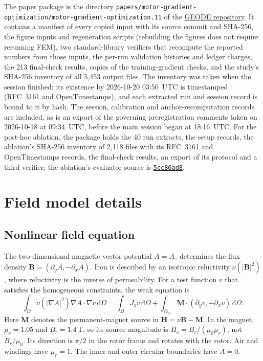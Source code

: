 \documentclass{anvil-paper}
\newcommand{\dd}{\,\mathrm{d}}
\begin{document}
The paper package is the directory
\texttt{papers/motor-gradient-optimization/motor-gradient-optimization.11}
of the \href{https://github.com/rjwalters/geode-fem}{GEODE repository}. It
contains a manifest of every copied input with its source commit and
SHA-256, the figure inputs and regeneration scripts (rebuilding the figures
does not require rerunning FEM), two standard-library verifiers that
recompute the reported numbers from those inputs, the per-run validation
histories and ledger charges, the 213 final-check results, copies of the
training-gradient checks, and the study's SHA-256 inventory of all 5,453
output files. The inventory was taken when the session finished; its
existence by 2026-10-20 03:50~UTC is timestamped (RFC~3161 and
OpenTimestamps), and each extracted run and session record is bound to it
by hash. The session, calibration and anchor-recomputation records are
included, as is an export of the governing preregistration comments taken
on 2026-10-18 at 09:34~UTC, before the main session began at 18:16~UTC.
For the post-hoc ablation, the package holds the 40 run extracts, the
setup records, the ablation's SHA-256 inventory of 2,118 files with its
RFC~3161 and OpenTimestamps records, the final-check results, an export of
its protocol and a third verifier; the ablation's evaluator source is
\href{https://github.com/rjwalters/geode-fem/tree/5cc86ad81aeea4847a2608fcafde22a1bbfb6990/benchmarks/motor_optimization}{\texttt{5cc86ad8}}.

\appendix
\section{Field model details}\label{sec:fieldmodel}
\subsection{Nonlinear field equation}
The two-dimensional magnetic vector potential $A=A_z$ determines the
flux density $\mathbf B=(\partial_y A,-\partial_x A)$. Iron is described
by an isotropic reluctivity $\nu(|\mathbf B|^2)$, where reluctivity is
the inverse of permeability. For a test function $v$ that satisfies the
homogeneous constraints, the weak equation is
\begin{equation}
 \int_\Omega \nu(|\nabla A|^2)\nabla A\cdot\nabla v\dd\Omega
 =\int_\Omega J_z v\dd\Omega
  +\int_{\Omega_m}\mathbf M\cdot(\partial_y v,-\partial_x v)\dd\Omega.
 \label{eq:weak}
\end{equation}
Here $\mathbf M$ denotes the permanent-magnet source in
$\mathbf H=\nu\mathbf B-\mathbf M$. In the magnet,
$\mu_r=1.05$ and $B_r=1.4$\,T, so its source magnitude is
$H_c=B_r/(\mu_0\mu_r)$, not $B_r/\mu_0$. Its direction is $\pi/2$
in the rotor frame and rotates with the rotor. Air and windings have
$\mu_r=1$. The inner and outer circular boundaries have $A=0$.
\end{document}
